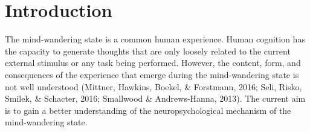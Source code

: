 \chapter{Introduction}
\label{ch:introduction}


The mind-wandering state is a common human experience. Human cognition has the capacity to generate thoughts that are only loosely related to the current external stimulus or any task being performed. However, the content, form, and consequences of the experience that emerge during the mind-wandering state is not well understood (Mittner, Hawkins, Boekel, \& Forstmann, 2016; Seli, Risko, Smilek, \& Schacter, 2016; Smallwood \& Andrews-Hanna, 2013). The current aim is to gain a better understanding of the neuropsychological mechanism of the mind-wandering state.


